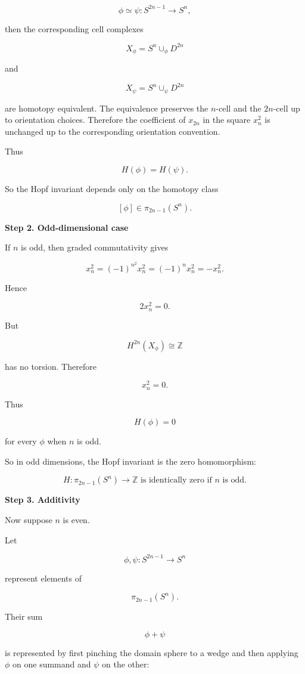 \begin{solution}
\[
\phi\simeq \psi:S^{2n-1}\to S^n,
\]

then the corresponding cell complexes

\[
X_\phi=S^n\cup_\phi D^{2n}
\]

and

\[
X_\psi=S^n\cup_\psi D^{2n}
\]

are homotopy equivalent. The equivalence preserves the \(n\)-cell and the \(2n\)-cell up to orientation choices. Therefore the coefficient of \(x_{2n}\) in the square \(x_n^2\) is unchanged up to the corresponding orientation convention.

Thus

\[
H(\phi)=H(\psi).
\]

So the Hopf invariant depends only on the homotopy class

\[
[\phi]\in \pi_{2n-1}(S^n).
\]


\medskip
\noindent\textbf{Step 2. Odd-dimensional case}\par
\smallskip


If \(n\) is odd, then graded commutativity gives

\[
x_n^2
=
(-1)^{n^2}x_n^2
=
(-1)^n x_n^2
=
-x_n^2.
\]

Hence

\[
2x_n^2=0.
\]

But

\[
H^{2n}(X_\phi)\cong \mathbb Z
\]

has no torsion. Therefore

\[
x_n^2=0.
\]

Thus

\[
H(\phi)=0
\]

for every \(\phi\) when \(n\) is odd.

So in odd dimensions, the Hopf invariant is the zero homomorphism:

\[
\boxed{
	H:\pi_{2n-1}(S^n)\to \mathbb Z
	\text{ is identically zero if }n\text{ is odd.}
}
\]


\medskip
\noindent\textbf{Step 3. Additivity}\par
\smallskip


Now suppose \(n\) is even.

Let

\[
\phi,\psi:S^{2n-1}\to S^n
\]

represent elements of

\[
\pi_{2n-1}(S^n).
\]

Their sum

\[
\phi+\psi
\]

is represented by first pinching the domain sphere to a wedge and then applying \(\phi\) on one summand and \(\psi\) on the other:


\end{solution}

